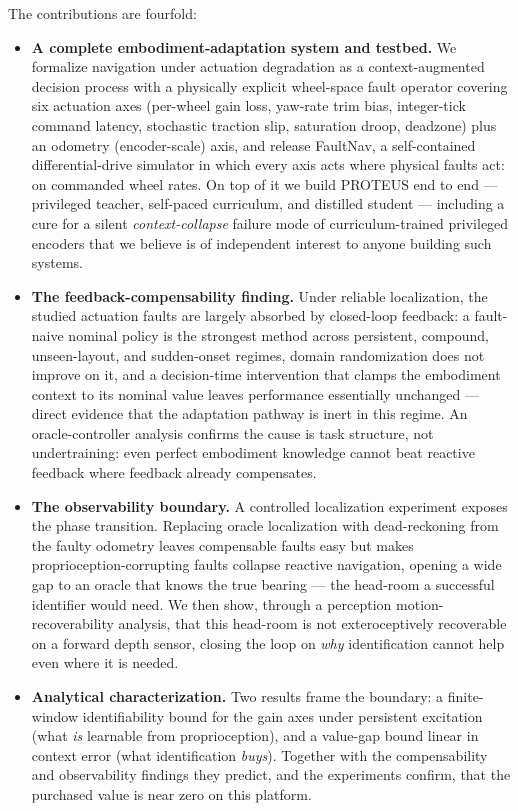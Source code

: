 \documentclass[journal]{IEEEtran}
\begin{document}
The contributions are fourfold:
\begin{itemize}
\item \textbf{A complete embodiment-adaptation system and testbed.} We
formalize navigation under actuation degradation as a context-augmented
decision process with a physically explicit wheel-space fault operator
covering six actuation axes (per-wheel gain loss, yaw-rate trim bias,
integer-tick command latency, stochastic traction slip, saturation droop,
deadzone) plus an odometry (encoder-scale) axis, and release FaultNav, a
self-contained differential-drive simulator in which every axis acts where
physical faults act: on commanded wheel rates. On top of it we build PROTEUS
end to end --- privileged teacher, self-paced curriculum, and distilled
student --- including a cure for a silent \emph{context-collapse} failure
mode of curriculum-trained privileged encoders that we believe is of
independent interest to anyone building such systems.
\item \textbf{The feedback-compensability finding.} Under reliable
localization, the studied actuation faults are largely absorbed by
closed-loop feedback: a fault-naive nominal policy is the strongest method
across persistent, compound, unseen-layout, and sudden-onset regimes, domain
randomization does not improve on it, and a decision-time intervention that
clamps the embodiment context to its nominal value leaves performance
essentially unchanged --- direct evidence that the adaptation pathway is
inert in this regime. An oracle-controller analysis confirms the cause is
task structure, not undertraining: even perfect embodiment knowledge cannot
beat reactive feedback where feedback already compensates.
\item \textbf{The observability boundary.} A controlled localization
experiment exposes the phase transition. Replacing oracle localization with
dead-reckoning from the faulty odometry leaves compensable faults easy but
makes proprioception-corrupting faults collapse reactive navigation, opening
a wide gap to an oracle that knows the true bearing --- the head-room a
successful identifier would need. We then show, through a perception
motion-recoverability analysis, that this head-room is not exteroceptively
recoverable on a forward depth sensor, closing the loop on \emph{why}
identification cannot help even where it is needed.
\item \textbf{Analytical characterization.} Two results frame the boundary:
a finite-window identifiability bound for the gain axes under persistent
excitation (what \emph{is} learnable from proprioception), and a value-gap
bound linear in context error (what identification \emph{buys}). Together
with the compensability and observability findings they predict, and the
experiments confirm, that the purchased value is near zero on this platform.
\end{itemize}
\end{document}
